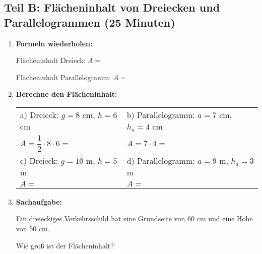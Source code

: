 \subsection*{Teil B: Flächeninhalt von Dreiecken und Parallelogrammen (25 Minuten)}

\begin{enumerate}[label=\arabic*.]
    \item \textbf{Formeln wiederholen:}
    \vspace{0.5cm}

    Flächeninhalt Dreieck: $A = $ \underline{\hspace{4cm}}

    Flächeninhalt Parallelogramm: $A = $ \underline{\hspace{4cm}}

    \vspace{1cm}

    \item \textbf{Berechne den Flächeninhalt:}
    \vspace{0.5cm}

    \begin{tabular}{ll}
        a) Dreieck: $g = 8$ cm, $h = 6$ cm & b) Parallelogramm: $a = 7$ cm, $h_a = 4$ cm \\[2ex]
        $A = \dfrac{1}{2} \cdot 8 \cdot 6 = $ \underline{\hspace{3cm}} & $A = 7 \cdot 4 = $ \underline{\hspace{3cm}} \\[4ex]
        c) Dreieck: $g = 10$ m, $h = 5$ m & d) Parallelogramm: $a = 9$ m, $h_a = 3$ m \\[2ex]
        $A = $ \underline{\hspace{4cm}} & $A = $ \underline{\hspace{4cm}}
    \end{tabular}

    \vspace{1cm}

    \item \textbf{Sachaufgabe:}

    Ein dreieckiges Verkehrsschild hat eine Grundseite von 60 cm und eine Höhe von 50 cm.

    Wie groß ist der Flächeninhalt? \underline{\hspace{4cm}}

\end{enumerate}